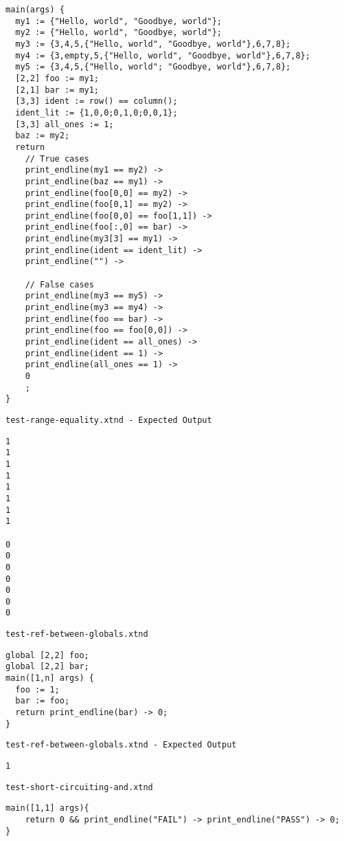 \begin{lstlisting}
main(args) {
  my1 := {"Hello, world", "Goodbye, world"};
  my2 := {"Hello, world", "Goodbye, world"};
  my3 := {3,4,5,{"Hello, world", "Goodbye, world"},6,7,8};
  my4 := {3,empty,5,{"Hello, world", "Goodbye, world"},6,7,8};
  my5 := {3,4,5,{"Hello, world"; "Goodbye, world"},6,7,8};
  [2,2] foo := my1;
  [2,1] bar := my1;
  [3,3] ident := row() == column();
  ident_lit := {1,0,0;0,1,0;0,0,1};
  [3,3] all_ones := 1;
  baz := my2;
  return
    // True cases
    print_endline(my1 == my2) ->
    print_endline(baz == my1) ->
    print_endline(foo[0,0] == my2) ->
    print_endline(foo[0,1] == my2) ->
    print_endline(foo[0,0] == foo[1,1]) ->
    print_endline(foo[:,0] == bar) ->
    print_endline(my3[3] == my1) ->
    print_endline(ident == ident_lit) ->
    print_endline("") ->

    // False cases
    print_endline(my3 == my5) ->
    print_endline(my3 == my4) ->
    print_endline(foo == bar) ->
    print_endline(foo == foo[0,0]) ->
    print_endline(ident == all_ones) ->
    print_endline(ident == 1) ->
    print_endline(all_ones == 1) ->
    0
    ;
}
\end{lstlisting}


\medskip \noindent \texttt{test-range-equality.xtnd - Expected Output}


\begin{lstlisting}
1
1
1
1
1
1
1
1

0
0
0
0
0
0
0
\end{lstlisting}


\medskip \noindent \texttt{test-ref-between-globals.xtnd}


\begin{lstlisting}
global [2,2] foo;
global [2,2] bar;
main([1,n] args) {
  foo := 1;
  bar := foo;
  return print_endline(bar) -> 0;
}
\end{lstlisting}


\medskip \noindent \texttt{test-ref-between-globals.xtnd - Expected Output}


\begin{lstlisting}
1
\end{lstlisting}


\medskip \noindent \texttt{test-short-circuiting-and.xtnd}


\begin{lstlisting}
main([1,1] args){
	return 0 && print_endline("FAIL") -> print_endline("PASS") -> 0;
}
\end{lstlisting}


